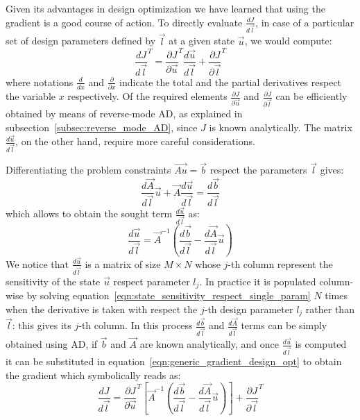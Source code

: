 \bigskip
Given its advantages in design optimization we have learned that using the gradient is a good course of action. To directly evaluate $\frac{dJ}{d\vec{l}}$, in case of a particular set of design parameters defined by $\vec{l}$ at a given state $\vec{u}$, we would compute:
\begin{equation}
	\label{eqn:generic_gradient_design_opt}
	\frac{dJ}{d\vec{l}}^T = \frac{\partial J}{\partial \vec{u}}^T \frac{d\vec{u}}{d\vec{l}} + \frac{\partial J}{\partial \vec{l}}^T
\end{equation}
where notations $\frac{d}{dx}$ and $\frac{\partial}{\partial x}$ indicate the total and the partial derivatives respect the variable $x$ respectively.
Of the required elements $\frac{\partial J}{\partial \vec{u}}$ and $\frac{\partial J}{\partial \vec{l}}$ can be efficiently obtained by means of reverse-mode AD, as explained in subsection~\vref{subsec:reverse_mode_AD}, since $J$ is known analytically. The matrix $\frac{d\vec{u}}{d\vec{l}}$, on the other hand, require more careful considerations.

Differentiating the problem constraints $\vec{Au} = \vec{b}$ respect the parameters $\vec{l}$ gives:
\begin{equation}
	\frac{d\vec{A}}{d\vec{l}} \vec{u} + \vec{A} \frac{d\vec{u}}{d\vec{l}} = \frac{d\vec{b}}{d\vec{l}}
\end{equation}
which allows to obtain the sought term $\frac{d\vec{u}}{d\vec{l}}$ as:
\begin{equation}
	\label{eqn:state_sensitivity_respect_single_param}
	\frac{d\vec{u}}{d\vec{l}} = \vec{A}^{-1} \left( \frac{d\vec{b}}{d\vec{l}} - \frac{d\vec{A}}{d\vec{l}}\vec{u} \right)
\end{equation}
We notice that $\frac{d\vec{u}}{d\vec{l}}$ is a matrix of size $M \times N$ whose $j$-th column represent the sensitivity of the state $\vec{u}$ respect parameter $l_j$. 
In practice it is populated column-wise by solving equation~\eqref{eqn:state_sensitivity_respect_single_param} $N$ times when the derivative is taken with respect the $j$-th design parameter $l_j$ rather than $\vec{l}$: this gives its $j$-th column. In this process $\frac{d\vec{b}}{d\vec{l}}$ and $\frac{d\vec{A}}{d\vec{l}}$ terms can be simply obtained using AD, if $\vec{b}$ and $\vec{A}$ are known analytically, and once $\frac{d\vec{u}}{d\vec{l}}$ is computed it can be substituted in equation~\eqref{eqn:generic_gradient_design_opt} to obtain the gradient which symbolically reads as:
\begin{equation}
	\label{eqn:generic_gradient_design_opt_naive}
	\frac{dJ}{d\vec{l}} = \frac{\partial J}{\partial \vec{u}}^T \left[ \vec{A}^{-1} \left( \frac{d\vec{b}}{d\vec{l}} - \frac{d\vec{A}}{d\vec{l}}\vec{u} \right) \right]  + \frac{\partial J}{\partial \vec{l}}^T
\end{equation}

